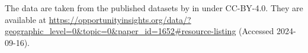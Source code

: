 \documentclass[10pt]{article}
\begin{document}
The data are taken from the published datasets by \citet{chetty2018opportunity} in 
\citet{DVN/NKCQM1_2022} under CC-BY-4.0. 
They are
available at \url{https://opportunityinsights.org/data/?geographic_level=0&topic=0&paper_id=1652#resource-listing} (Accessed
2024-09-16). 






\end{document}
